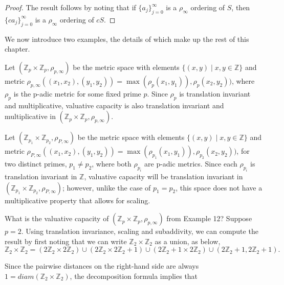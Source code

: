 \begin{proof} 
The result follows by noting that if $\{a_j\}_{j=0}^\infty$ is a $\rho_\infty$ ordering of $S$, then $\{ca_j\}_{j=0}^\infty$ is a $\rho_\infty$ ordering of $cS$.
\end{proof}

We now introduce two examples, the details of which make up the rest of this chapter.\\ 

\begin{example}
	Let $(\mathbb{Z}_p \times \mathbb{Z}_p, \rho_{p,\infty})$ be the metric space with elements $\{(x,y)\mid x,y \in \mathbb{Z}\}$ and metric $\rho_{p,\infty}((x_1,x_2), (y_1,y_2)) = \max(\rho_p(x_1, y_1)), \rho_p(x_2, y_2))$, where $\rho_p$ is the p-adic metric for some fixed prime $p$. Since $\rho_p$ is translation invariant and multiplicative, valuative capacity is also translation invariant and multiplicative in  $(\mathbb{Z}_p \times \mathbb{Z}_p, \rho_{p,\infty})$.
\end{example}

\begin{example}
	Let $(\mathbb{Z}_{p_1} \times \mathbb{Z}_{p_2}, \rho_{P,\infty})$ be the metric space with elements $\{(x,y)\mid x,y \in \mathbb{Z}\}$ and metric $\rho_{P,\infty}((x_1,x_2), (y_1,y_2)) = \max(\rho_{p_1}(x_1, y_1)), \rho_{p_2}(x_2, y_2))$, for two distinct primes, $p_1 \neq p_2$, where both $\rho_{p_i}$ are p-adic metrics. Since each $\rho_{p_i}$ is translation invariant in $\mathbb{Z}$, valuative capacity will be translation invariant  in  $(\mathbb{Z}_{p_1} \times \mathbb{Z}_{p_2}, \rho_{P,\infty})$; however, unlike the case of $p_1=p_2$, this space does not have a multiplicative property that allows for scaling.
\end{example}

What is the valuative capacity of  $(\mathbb{Z}_p \times \mathbb{Z}_p, \rho_{p,\infty})$  from Example 12? Suppose $p=2$.  Using translation invariance, scaling and subaddivity, we can compute the result by first noting that we can write $\mathbb{Z}_2 \times \mathbb{Z}_2$ as a union, as below,\\
\[
\mathbb{Z}_2 \times \mathbb{Z}_2 = (2\mathbb{Z}_2 \times 2\mathbb{Z}_2) \cup (2\mathbb{Z}_2 \times 2\mathbb{Z}_2 +1) \cup (2\mathbb{Z}_2+1 \times 2\mathbb{Z}_2) \cup (2\mathbb{Z}_2+1, 2\mathbb{Z}_2+1).
\]

Since the pairwise distances on the right-hand side are always $1 = diam(\mathbb{Z}_2 \times \mathbb{Z}_2)$, the decomposition formula implies that \\

